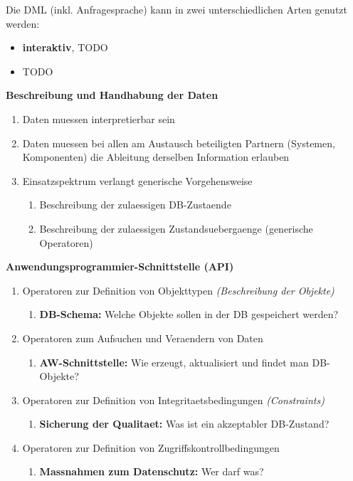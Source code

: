\documentclass[a4paper,10pt]{article}
\begin{document}
Die DML (inkl. Anfragesprache) kann in zwei unterschiedlichen Arten genutzt werden:
\begin{itemize}
\item \textbf{interaktiv}, TODO
\item TODO
\end{itemize}

\textbf{Beschreibung und Handhabung der Daten}
\begin{enumerate}
\item Daten muessen interpretierbar sein
\item Daten muessen bei allen am Austausch beteiligten Partnern (Systemen, Komponenten) die Ableitung derselben Information erlauben
\item Einsatzspektrum verlangt generische Vorgehensweise
\begin{enumerate}
\item Beschreibung der zulaessigen DB-Zustaende
\item Beschreibung der zulaessigen Zustandsuebergaenge (generische Operatoren)
\end{enumerate}
\end{enumerate}

\textbf{Anwendungsprogrammier-Schnittstelle (API)}
\begin{enumerate}
\item Operatoren zur Definition von Objekttypen \emph{(Beschreibung der Objekte)}
\begin{enumerate}
\item \textbf{DB-Schema:} Welche Objekte sollen in der DB gespeichert werden?
\end{enumerate}
\item Operatoren zum Aufsuchen und Veraendern von Daten
\begin{enumerate}
\item \textbf{AW-Schnittstelle:} Wie erzeugt, aktualisiert und findet man DB-Objekte?
\end{enumerate}
\item Operatoren zur Definition von Integritaetsbedingungen \emph{(Constraints)}
\begin{enumerate}
\item \textbf{Sicherung der Qualitaet:} Was ist ein akzeptabler DB-Zustand?
\end{enumerate}
\item Operatoren zur Definition von Zugriffskontrollbedingungen
\begin{enumerate}
\item \textbf{Massnahmen zum Datenschutz:} Wer darf was?
\end{enumerate}
\end{enumerate}
\end{document}
